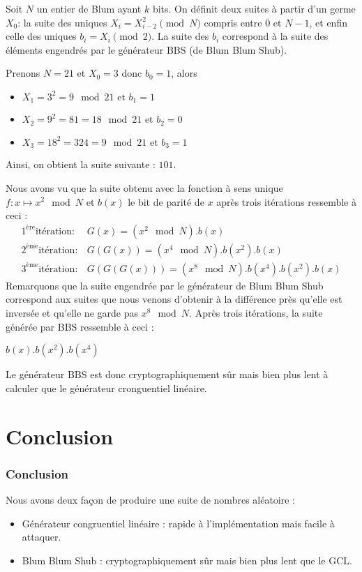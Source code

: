 \documentclass[utf8,10pt,french]{beamer}
\begin{document}
\begin{frame}
\begin{definition}
Soit $N$ un entier de Blum ayant $k$ bits. On définit deux suites à partir d'un germe $X_{0}$: la suite des uniques $X_{i}=X_{i-2}^{2} \pmod{N}$ compris entre $0$ et $N-1$, et enfin celle des uniques $b_{i}=X_{i} \pmod{2}$. La suite des $b_{i}$ correspond à la suite des éléments engendrés par le générateur BBS (de Blum Blum Shub).
\end{definition} \pause
\begin{example}
Prenons $N=21$ et $X_0=3$ donc $b_0=1$, alors 
\begin{itemize}
\item $X_1=3^2=9 \mod{21} \mbox{ et } b_1=1 $\\
\item $X_2=9^2=81=18 \mod{21} \mbox{ et } b_2=0 $\\
\item $X_3=18^2=324=9 \mod{21} \mbox{ et } b_3=1$
\end{itemize}
Ainsi, on obtient la suite suivante : $101$.
\end{example}
\end{frame}

\begin{frame}
Nous avons vu que la suite obtenu avec la fonction à sens unique $f:x \mapsto x^2 \mod{N}$ et $b(x)$ le bit de parité de $x$ après trois itérations ressemble à ceci :
 \begin{align}
1^{\mbox{ère}} \mbox{itération}: &G(x)=(x^2 \mod{N}) . b(x)\\
2^{\mbox{ème}} \mbox{itération}: & G(G(x))= (x^4 \mod{N}) . b(x^2) . b(x) \\
3^{\mbox{ème}} \mbox{itération}: & G(G(G(x)))=(x^8 \mod{N}). b(x^4) . b(x^2) . b(x)
\end{align} \pause
Remarquons que la suite engendrée par le générateur de Blum Blum Shub correspond aux suites que nous venons d'obtenir à la différence près qu'elle est inversée et qu'elle ne garde pas $x^8 \mod{N}$. Après trois itérations, la suite générée par BBS ressemble à ceci : 
\begin{center}
$b(x).b(x^2).b(x^4)$
\end{center} \pause
Le générateur BBS est donc cryptographiquement sûr mais bien plus lent à calculer que le générateur cronguentiel linéaire.
\end{frame}




\section{Conclusion}
\begin{frame}
  \frametitle{Conclusion}
Nous avons deux façon de produire une suite de nombres aléatoire :\pause
\begin{itemize}
\item Générateur congruentiel linéaire : rapide à l'implémentation mais facile à attaquer.\pause
\item Blum Blum Shub : cryptographiquement sûr mais bien plus lent que le GCL.
\end{itemize}
\end{frame}
\end{document}
